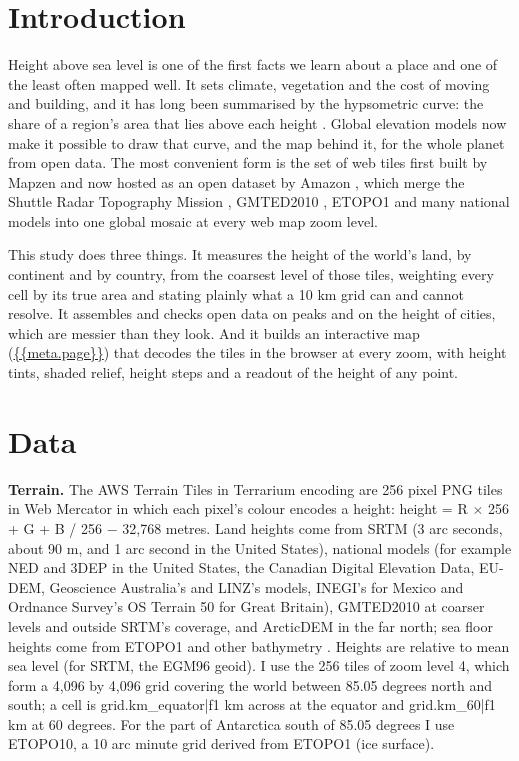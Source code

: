 \documentclass[11pt,a4paper]{article}
\begin{document}
\section{Introduction}
Height above sea level is one of the first facts we learn about a place and one of the least often mapped well. It sets climate, vegetation and the cost of moving and building, and it has long been summarised by the hypsometric curve: the share of a region's area that lies above each height \citep{strahler}. Global elevation models now make it possible to draw that curve, and the map behind it, for the whole planet from open data. The most convenient form is the set of web tiles first built by Mapzen and now hosted as an open dataset by Amazon \citep{terraintiles}, which merge the Shuttle Radar Topography Mission \citep{srtm}, GMTED2010 \citep{gmted}, ETOPO1 \citep{etopo1} and many national models into one global mosaic at every web map zoom level.

This study does three things. It measures the height of the world's land, by continent and by country, from the coarsest level of those tiles, weighting every cell by its true area and stating plainly what a 10 km grid can and cannot resolve. It assembles and checks open data on peaks and on the height of cities, which are messier than they look. And it builds an interactive map (\url{{{meta.page}}}) that decodes the tiles in the browser at every zoom, with height tints, shaded relief, height steps and a readout of the height of any point.

\section{Data}
\textbf{Terrain.} The AWS Terrain Tiles in Terrarium encoding are 256 pixel PNG tiles in Web Mercator in which each pixel's colour encodes a height: height = R $\times$ 256 + G + B / 256 $-$ 32,768 metres. Land heights come from SRTM (3 arc seconds, about 90 m, and 1 arc second in the United States), national models (for example NED and 3DEP in the United States, the Canadian Digital Elevation Data, EU-DEM, Geoscience Australia's and LINZ's models, INEGI's for Mexico and Ordnance Survey's OS Terrain 50 for Great Britain), GMTED2010 at coarser levels and outside SRTM's coverage, and ArcticDEM in the far north; sea floor heights come from ETOPO1 and other bathymetry \citep{joerd}. Heights are relative to mean sea level (for SRTM, the EGM96 geoid). I use the 256 tiles of zoom level 4, which form a 4,096 by 4,096 grid covering the world between 85.05 degrees north and south; a cell is {{grid.km_equator|f1}} km across at the equator and {{grid.km_60|f1}} km at 60 degrees. For the part of Antarctica south of 85.05 degrees I use ETOPO10, a 10 arc minute grid derived from ETOPO1 (ice surface).
\end{document}
